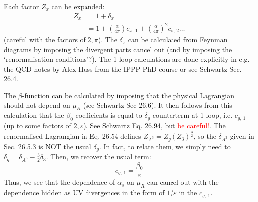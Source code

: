 \documentclass[main.tex]{subfiles}
\begin{document}
Each factor $Z_x$ can be expanded:
\begin{align}
    Z_x &= 1 + \delta_x \\
        &= 1 + \left( \frac{\alpha}{4 \pi} \right) c_{x,\,1} + \left(\frac{\alpha}{4 \pi}\right)^2 c_{x,\,2} \ldots
\end{align}
(careful with the factors of $2, \pi$). The $\delta_x$ can be calculated from Feynman diagrams by imposing the divergent parts cancel out (and by imposing the `renormalisation conditions'?). The 1-loop calculations are done explicitly in e.g. the QCD notes by Alex Huss from the IPPP PhD course or see Schwartz Sec. 26.4.

The $\beta$-function can be calculated by imposing that the physical Lagrangian should not depend on $\mu_R$ (see Schwartz Sec 26.6). It then follows from this calculation that the $\beta_0$ coefficients is equal to $\delta_g$ counterterm at 1-loop, i.e. $c_{g,\,1}$ (up to some factors of $2, \varepsilon$). See Schwartz Eq. 26.94, but \textcolor{red}{be careful!}. The renormalised Lagrangian in Eq. 26.54 defines $Z_{A^3} = Z_g (Z_3)^\frac{3}{2}$, so the $\delta_{A^3}$ given in Sec. 26.5.3 is NOT the usual $\delta_g$. In fact, to relate them, we simply need to $\delta_g = \delta_{A^3} -\frac{3}{2}\delta_3$. Then, we recover the usual term:
\begin{equation}
    c_{g,\,1} = \frac{\beta_0}{\varepsilon}
\end{equation}
Thus, we see that the dependence of $\alpha_s$ on $\mu_R$ can cancel out with the dependence hidden as UV divergences in the form of $1/\varepsilon$ in the $c_{g,\,1}$.
\end{document}
